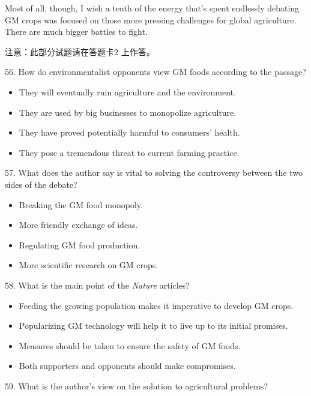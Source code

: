 \documentclass[UTF8,11pt]{ctexart}
\begin{document}
Most of all, though, I wish a tenth of the energy that’s spent endlessly debating GM crops was focused on those more pressing challenges for global agriculture. There are much bigger battles to fight.


注意：此部分试题请在答题卡2 上作答。


56. How do environmentalist opponents view GM foods according to the passage?


\begin{itemize}[leftmargin=2em,itemsep=.2em,topsep=.4em]\item[A.] They will eventually ruin agriculture and the environment.
\item[B.] They are used by big businesses to monopolize agriculture.
\item[C.] They have proved potentially harmful to consumers’ health.
\item[D.] They pose a tremendous threat to current farming practice.
\end{itemize}

57. What does the author say is vital to solving the controversy between the two sides of the debate?


\begin{itemize}[leftmargin=2em,itemsep=.2em,topsep=.4em]\item[A.] Breaking the GM food monopoly.
\item[B.] More friendly exchange of ideas.
\item[C.] Regulating GM food production.
\item[D.] More scientific research on GM crops.
\end{itemize}

58. What is the main point of the\textit{ Nature} articles?


\begin{itemize}[leftmargin=2em,itemsep=.2em,topsep=.4em]\item[A.] Feeding the growing population makes it imperative to develop GM crops.
\item[B.] Popularizing GM technology will help it to live up to its initial promises.
\item[C.] Measures should be taken to ensure the safety of GM foods.
\item[D.] Both supporters and opponents should make compromises.
\end{itemize}

59. What is the author’s view on the solution to agricultural problems?
\end{document}
